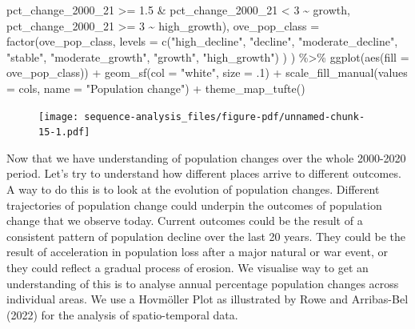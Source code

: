 \documentclass[
  letterpaper,
  DIV=11,
  numbers=noendperiod]{scrreprt}
\newenvironment{Shaded}{\begin{snugshade}}{\end{snugshade}}
\newcommand{\AttributeTok}[1]{\textcolor[rgb]{0.40,0.45,0.13}{#1}}
\newcommand{\DecValTok}[1]{\textcolor[rgb]{0.68,0.00,0.00}{#1}}
\newcommand{\FloatTok}[1]{\textcolor[rgb]{0.68,0.00,0.00}{#1}}
\newcommand{\FunctionTok}[1]{\textcolor[rgb]{0.28,0.35,0.67}{#1}}
\newcommand{\NormalTok}[1]{\textcolor[rgb]{0.00,0.23,0.31}{#1}}
\newcommand{\SpecialCharTok}[1]{\textcolor[rgb]{0.37,0.37,0.37}{#1}}
\newcommand{\StringTok}[1]{\textcolor[rgb]{0.13,0.47,0.30}{#1}}
\begin{document}
\begin{Shaded}
\begin{Highlighting}[]
\NormalTok{                           pct\_change\_2000\_21 }\SpecialCharTok{\textgreater{}=} \FloatTok{1.5} \SpecialCharTok{\&}\NormalTok{ pct\_change\_2000\_21 }\SpecialCharTok{\textless{}} \DecValTok{3} \SpecialCharTok{\textasciitilde{}} \StringTok{\textquotesingle{}growth\textquotesingle{}}\NormalTok{,}
\NormalTok{                           pct\_change\_2000\_21 }\SpecialCharTok{\textgreater{}=} \DecValTok{3} \SpecialCharTok{\textasciitilde{}} \StringTok{\textquotesingle{}high\_growth\textquotesingle{}}\NormalTok{),}
    \AttributeTok{ove\_pop\_class =} \FunctionTok{factor}\NormalTok{(ove\_pop\_class, }
         \AttributeTok{levels =} \FunctionTok{c}\NormalTok{(}\StringTok{"high\_decline"}\NormalTok{, }\StringTok{"decline"}\NormalTok{, }\StringTok{"moderate\_decline"}\NormalTok{, }\StringTok{"stable"}\NormalTok{, }\StringTok{"moderate\_growth"}\NormalTok{, }\StringTok{"growth"}\NormalTok{, }\StringTok{"high\_growth"}\NormalTok{) )}
\NormalTok{    ) }\SpecialCharTok{\%\textgreater{}\%} 
  \FunctionTok{ggplot}\NormalTok{(}\FunctionTok{aes}\NormalTok{(}\AttributeTok{fill =}\NormalTok{ ove\_pop\_class)) }\SpecialCharTok{+}
  \FunctionTok{geom\_sf}\NormalTok{(}\AttributeTok{col =} \StringTok{"white"}\NormalTok{, }\AttributeTok{size =}\NormalTok{ .}\DecValTok{1}\NormalTok{) }\SpecialCharTok{+}
  \FunctionTok{scale\_fill\_manual}\NormalTok{(}\AttributeTok{values =}\NormalTok{ cols,}
                    \AttributeTok{name =} \StringTok{"Population change"}\NormalTok{) }\SpecialCharTok{+}
  \FunctionTok{theme\_map\_tufte}\NormalTok{() }
\end{Highlighting}
\end{Shaded}

\begin{figure}[H]

{\centering \texttt{[image: sequence-analysis\_files/figure-pdf/unnamed-chunk-15-1.pdf]}

}

\end{figure}

Now that we have understanding of population changes over the whole
2000-2020 period. Let's try to understand how different places arrive to
different outcomes. A way to do this is to look at the evolution of
population changes. Different trajectories of population change could
underpin the outcomes of population change that we observe today.
Current outcomes could be the result of a consistent pattern of
population decline over the last 20 years. They could be the result of
acceleration in population loss after a major natural or war event, or
they could reflect a gradual process of erosion. We visualise way to get
an understanding of this is to analyse annual percentage population
changes across individual areas. We use a Hovmöller Plot as illustrated
by Rowe and Arribas-Bel (2022) for the analysis of spatio-temporal data.
\end{document}
